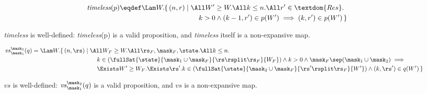 
\begin{align*}
	\textit{timeless}(p) \eqdef 
	\begin{aligned}[t]
		\Lam W.
		\{\, (n, r) &\mid \All W' \geq W. \All k \leq n. \All r' \in \textdom{Res}. \\
		&\qquad
		k > 0 \land (k - 1, r') \in p(W') \implies (k, r') \in p(W') \,\}
	\end{aligned}
\end{align*}

\begin{lem}
	\textit{timeless} is well-defined: \textit{timeless}(p) is a valid proposition, and \textit{timeless} itself is a non-expansive map.
\end{lem}


\begin{align*}
	\mathit{vs}_{\mask_1}^{\mask_2}(q) &= \Lam W.
	\begin{aligned}[t]
		\{\, (n, \rs) &\mid \All W_F \geq W. \All \rs_F, \mask_F, \state. \All k \leq n.\\
		&\qquad 
		k \in (\fullSat{\state}{\mask_1 \cup \mask_F}{\rs \rsplit \rs_F}{W_F}) \land k > 0 \land \mask_F \sep (\mask_1 \cup \mask_2) \implies{} \\
		&\qquad
		\Exists W' \geq W_F. \Exists \rs'. k \in (\fullSat{\state}{\mask_2 \cup \mask_F}{\rs' \rsplit \rs_F}{W'}) \land (k, \rs') \in q(W')
		\,\}
	\end{aligned}
\end{align*}
\begin{lem}
	$\mathit{vs}$ is well-defined: $\mathit{vs}_{\mask_1}^{\mask_2}(q)$ is a valid proposition, and $\mathit{vs}$ is a non-expansive map.
\end{lem}



